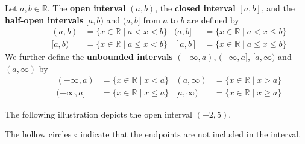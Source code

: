 \begin{definition}
\label{defIntervals}
\nindex{abint3}{$(a,b]$}{half-open interval}
\nindex{abint4}{$[a,b)$}{half-open interval}
Let $a,b \in \mathbb{R}$. The \textbf{open interval} $(a,b)$, the \textbf{closed interval} $[a,b]$, and the \textbf{half-open intervals} $[a,b)$ and $(a,b]$ from $a$ to $b$ are defined by
\begin{align*}
\hspace{35pt} (a,b) &= \{ x \in \mathbb{R} \mid a < x < b \}
&
(a,b] &= \{ x \in \mathbb{R} \mid a < x \le b \} 
\\
\hspace{35pt} [a,b) &= \{ x \in \mathbb{R} \mid a \le x < b \}
&
[a,b] &= \{ x \in \mathbb{R} \mid a \le x \le b \}
\end{align*}
We further define the \textbf{unbounded intervals} $(-\infty, a)$, $(-\infty, a]$, $[a, \infty)$ and $(a, \infty)$  by
\begin{align*}
\hspace{35pt} (-\infty,a) &= \{ x \in \mathbb{R} \mid x < a \}
&
(a,\infty) &= \{ x \in \mathbb{R} \mid x > a \}
\\
\hspace{35pt} (-\infty, a] &= \{ x \in \mathbb{R} \mid x \le a \} 
&
[a,\infty) &= \{ x \in \mathbb{R} \mid x \ge a \}
\end{align*}
\end{definition}

\begin{example}
The following illustration depicts the open interval $(-2,5)$.

\vspace{-10pt}
\begin{center}
\end{center}
The hollow circles $\circ$ indicate that the endpoints are not included in the interval.
\end{example}

